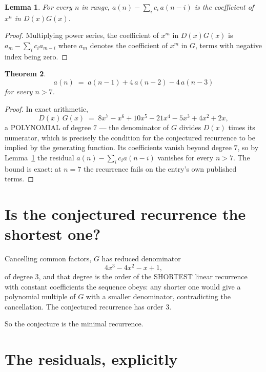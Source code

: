 \documentclass[11pt,a4paper]{article}
\theoremstyle{plain}
\newtheorem{theorem}{Theorem}
\newtheorem{lemma}[theorem]{Lemma}
\theoremstyle{definition}
\begin{document}
\begin{lemma}\label{lem:key}
For every $n$ in range, $a(n)-\sum_i c_i\,a(n-i)$ is the coefficient of $x^{n}$ in
$D(x)G(x)$.
\end{lemma}

\begin{proof}
Multiplying power series, the coefficient of $x^{m}$ in $D(x)G(x)$ is
$a_m-\sum_i c_i a_{m-i}$ where $a_m$ denotes the coefficient of $x^{m}$ in $G$, terms with
negative index being zero.
\end{proof}

\begin{theorem}
\[
a(n)\;=\;a(n-1) + 4\,a(n-2) - 4\,a(n-3)
\]
for every $n>7$.
\end{theorem}

\begin{proof}
In exact arithmetic,
\[
D(x)\,G(x)\;=\;8 x^{7} - x^{6} + 10 x^{5} - 21 x^{4} - 5 x^{3} + 4 x^{2} + 2 x,
\]
a POLYNOMIAL of degree $7$ --- the denominator of $G$ divides $D(x)$ times its numerator,
which is precisely the condition for the conjectured recurrence to be implied by the
generating function. Its coefficients vanish beyond degree $7$, so by
Lemma~\ref{lem:key} the residual $a(n)-\sum_ic_ia(n-i)$ vanishes for every
$n>7$. The bound is exact: at $n=7$ the recurrence fails on the entry's own published terms.
\end{proof}

\section{Is the conjectured recurrence the shortest one?}

Cancelling common factors, $G$ has reduced denominator
\[
4 x^{3} - 4 x^{2} - x + 1,
\]
of degree $3$, and that degree is the order of the SHORTEST linear recurrence with
constant coefficients the sequence obeys: any shorter one would give a polynomial multiple of
$G$ with a smaller denominator, contradicting the cancellation. The conjectured recurrence has
order $3$.

So the conjecture is the minimal recurrence.

\section{The residuals, explicitly}
\end{document}
